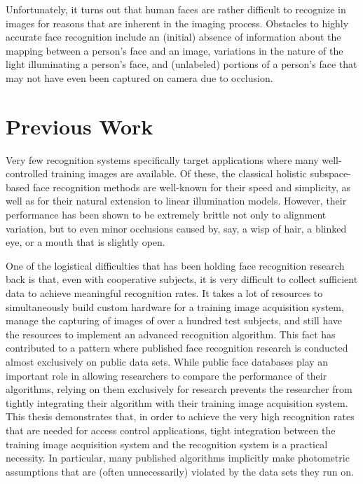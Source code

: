 Unfortunately, it turns out that human faces are rather difficult to recognize
in images for reasons that are inherent in the imaging process.  Obstacles to
highly accurate face recognition include an (initial) absence of information
about the mapping between a person's face and an image, variations in the nature of
the light illuminating a person's face, and (unlabeled) portions of a person's
face that may not have even been captured on camera due to occlusion.  

\section{Previous Work} Very few recognition systems specifically target
applications where many well-controlled training images are available.  Of
these, the classical holistic subspace-based face recognition methods
\cite{Turk1991-CVPR,Belhumeur1997-PAMI} are well-known for their speed and
simplicity, as well as for their natural extension to linear illumination
models.  However, their performance has been shown to be extremely brittle not
only to alignment variation, but to even minor occlusions caused by, say, a
wisp of hair, a blinked eye, or a mouth that is slightly open. 

One of the logistical difficulties that has been holding face recognition
research back is that, even with cooperative subjects, it is very difficult to
collect sufficient data to achieve meaningful recognition rates.  It takes a
lot of resources to simultaneously build custom hardware for a training image
acquisition system, manage the capturing of images of over a hundred test
subjects, and still have the resources to implement an advanced recognition
algorithm.  This fact has contributed to a pattern where published face
recognition research is conducted almost exclusively on public data sets.
While public face databases play an important role in allowing researchers to
compare the performance of their algorithms, relying on them exclusively for
research prevents the researcher from tightly integrating their algorithm with
their training image acquisition system.  This thesis demonstrates that, in
order to achieve the very high recognition rates that are needed for access
control applications, tight integration between the training image acquisition
system and the recognition system is a practical necessity.  In particular,
many published algorithms implicitly make photometric assumptions that are
(often unnecessarily) violated by the data sets they run on.  

